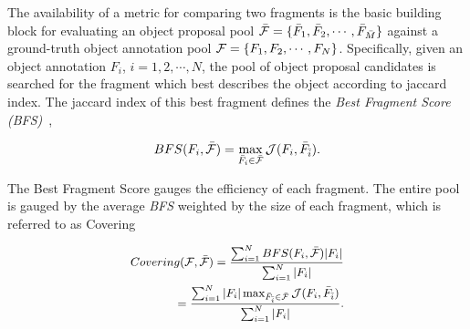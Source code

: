 
The availability of a metric for comparing two fragments is the basic building block for evaluating an object proposal pool ${\cal \bar F}=\{\bar F_1, \bar F_2, \cdots, \bar F_{\bar M}\}$ against a ground-truth object annotation pool ${\cal F}=\{F_1, F_2, \cdots, F_N\}$. Specifically, given an object annotation $F_i$, $i=1,2,\cdots,N$, the pool of object proposal candidates is searched for the fragment which best describes the object according to jaccard index. The jaccard index of this best fragment defines the \textit{Best Fragment Score (BFS)}~\cite{Carreira:Sminchisescu:PAMI12,Endres:Hoiem:ECCV10},

\begin{equation}
\small
BFS(F_{i}, {\cal \bar F}) = \max_{\bar F_{i}\in{\cal \bar F}}{\cal J}(F_i,\bar F_{\bar i}).
\label{eq:bfs}
\end{equation}

\noindent
The Best Fragment Score gauges the efficiency of each fragment. The entire pool is gauged by the average \emph{BFS} weighted by the size of each fragment, which is referred to as Covering~\cite{Arbelaez:etal:PAMI11}




\begin{equation}
\small
\begin{split}
Covering({\cal F}, {\cal \bar F}) =\frac{\sum_{i=1}^N  BFS(F_{i}, {\cal \bar F})|F_i| }{\sum_{i=1}^N |F_i|} \\
=\frac{\sum_{i=1}^N  |F_i|\max_{\bar F_{\bar i}\in{\cal \bar F}}{\cal J}(F_i,\bar F_{\bar i}) }{\sum_{i=1}^N |F_i|}.
\end{split} 
\label{eq:covering}
\end{equation}\noindent

